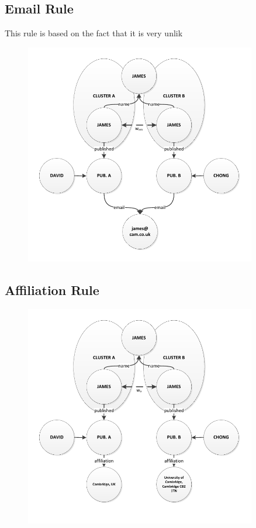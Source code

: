 \subsection{Email Rule}

This rule is based on the fact that it is very unlik

\begin{figure}[htb]
	\centering
		\includegraphics[width=0.9\textwidth]{fig/emailrule}
	\caption{}
	\label{fig:emailrule}
\end{figure}

\subsection{Affiliation Rule}

\begin{figure}[htb]
	\centering
		\includegraphics[width=0.9\textwidth]{fig/affiliationrule}
	\caption{}
	\label{fig:affiliationrule}
\end{figure}
